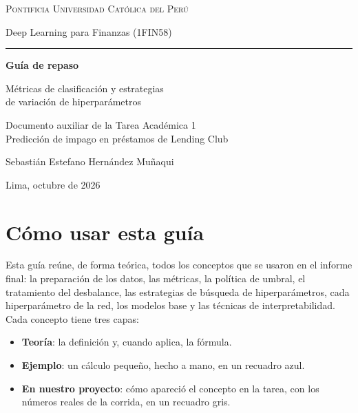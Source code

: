 \documentclass[11pt,a4paper]{article}
\begin{document}
\begin{titlepage}
\centering
{\large\scshape Pontificia Universidad Católica del Perú\par}
\vspace{0.2cm}
{\normalsize Deep Learning para Finanzas (1FIN58)\par}
\vspace{3.5cm}
{\color{azul}\rule{\linewidth}{1pt}}\par\vspace{0.6cm}
{\Huge\bfseries\color{azul} Guía de repaso\par}
\vspace{0.4cm}
{\LARGE Métricas de clasificación y estrategias\\[0.1cm] de variación de hiperparámetros\par}
\vspace{0.5cm}{\color{azul}\rule{\linewidth}{1pt}}\par
\vspace{1cm}
{\large Documento auxiliar de la Tarea Académica 1\\ Predicción de impago en préstamos de Lending Club\par}
\vfill
{\large Sebastián Estefano Hernández Muñaqui\par}
\vspace{0.8cm}
{\normalsize Lima, octubre de 2026\par}
\end{titlepage}

\tableofcontents
\newpage

\section*{Cómo usar esta guía}

Esta guía reúne, de forma teórica, todos los conceptos que se usaron en el informe final: la preparación de los datos, las métricas, la política de umbral, el tratamiento del desbalance, las estrategias de búsqueda de hiperparámetros, cada hiperparámetro de la red, los modelos base y las técnicas de interpretabilidad. Cada concepto tiene tres capas:

\begin{itemize}
\item \textbf{Teoría}: la definición y, cuando aplica, la fórmula.
\item \textbf{Ejemplo}: un cálculo pequeño, hecho a mano, en un recuadro azul.
\item \textbf{En nuestro proyecto}: cómo apareció el concepto en la tarea, con los números reales de la corrida, en un recuadro gris.
\end{itemize}
\end{document}
